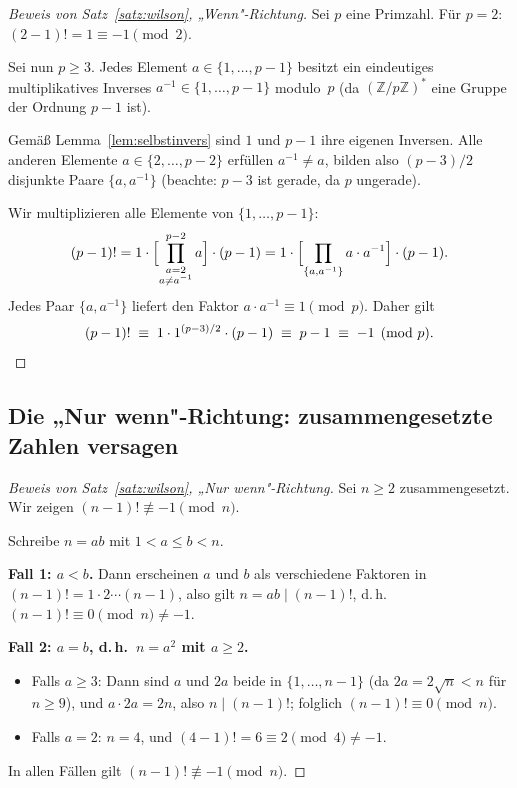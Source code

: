 \documentclass[12pt,a4paper]{amsart}
\theoremstyle{definition}
\newcommand{\Z}{\mathbb{Z}}
\begin{document}
\begin{proof}[Beweis von Satz~\ref{satz:wilson}, „Wenn"-Richtung]
  Sei $p$ eine Primzahl.  Für $p = 2$: $(2-1)! = 1 \equiv -1 \pmod{2}$. \checkmark

  Sei nun $p \geq 3$.
  Jedes Element $a \in \{1, \ldots, p-1\}$ besitzt ein eindeutiges
  multiplikatives Inverses $a^{-1} \in \{1, \ldots, p-1\}$ modulo~$p$
  (da $(\Z/p\Z)^*$ eine Gruppe der Ordnung $p-1$ ist).

  Gemäß Lemma~\ref{lem:selbstinvers} sind $1$ und $p-1$ ihre eigenen Inversen.
  Alle anderen Elemente $a \in \{2, \ldots, p-2\}$ erfüllen $a^{-1} \neq a$,
  bilden also $(p-3)/2$ disjunkte Paare $\{a, a^{-1}\}$
  (beachte: $p-3$ ist gerade, da $p$ ungerade).

  Wir multiplizieren alle Elemente von $\{1, \ldots, p-1\}$:
  \[
    (p-1)!
    = 1 \cdot \Bigl[\prod_{\substack{a=2 \\ a \neq a^{-1}}}^{p-2} a\Bigr]
      \cdot (p-1)
    = 1 \cdot \Bigl[\prod_{\{a,a^{-1}\}} a \cdot a^{-1}\Bigr] \cdot (p-1).
  \]
  Jedes Paar $\{a, a^{-1}\}$ liefert den Faktor $a \cdot a^{-1} \equiv 1 \pmod{p}$.
  Daher gilt
  \[
    (p-1)! \;\equiv\; 1 \cdot 1^{(p-3)/2} \cdot (p-1)
             \;\equiv\; p-1 \;\equiv\; -1 \pmod{p}. \qedhere
  \]
\end{proof}

\subsection{Die „Nur wenn"-Richtung: zusammengesetzte Zahlen versagen}

\begin{proof}[Beweis von Satz~\ref{satz:wilson}, „Nur wenn"-Richtung]
  Sei $n \geq 2$ zusammengesetzt.  Wir zeigen $(n-1)! \not\equiv -1 \pmod{n}$.

  Schreibe $n = ab$ mit $1 < a \leq b < n$.

  \textbf{Fall 1: $a < b$.}
  Dann erscheinen $a$ und $b$ als verschiedene Faktoren in
  $(n-1)! = 1 \cdot 2 \cdots (n-1)$,
  also gilt $n = ab \mid (n-1)!$, d.\,h.\ $(n-1)! \equiv 0 \pmod{n} \neq -1$.

  \textbf{Fall 2: $a = b$, d.\,h.\ $n = a^2$ mit $a \geq 2$.}
  \begin{itemize}
    \item Falls $a \geq 3$: Dann sind $a$ und $2a$ beide in $\{1, \ldots, n-1\}$
      (da $2a = 2\sqrt{n} < n$ für $n \geq 9$), und $a \cdot 2a = 2n$,
      also $n \mid (n-1)!$; folglich $(n-1)! \equiv 0 \pmod{n}$.
    \item Falls $a = 2$: $n = 4$, und $(4-1)! = 6 \equiv 2 \pmod{4} \neq -1$.
  \end{itemize}
  In allen Fällen gilt $(n-1)! \not\equiv -1 \pmod{n}$. \qedhere
\end{proof}
\end{document}
